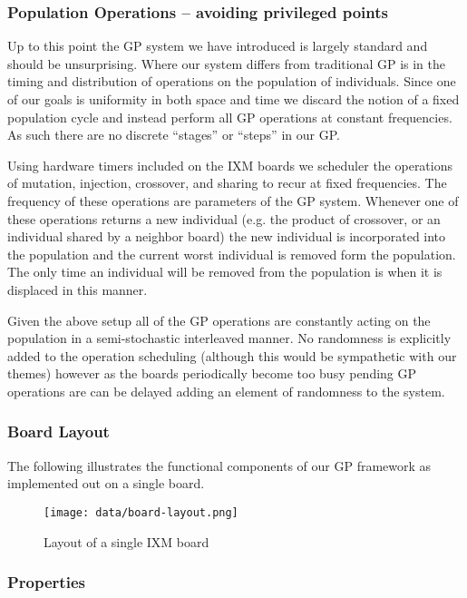 \documentclass[11pt]{article}
\begin{document}
\subsubsection*{Population Operations -- avoiding privileged points}
\label{sec-1.3.3}

Up to this point the GP system we have introduced is largely standard
and should be unsurprising.  Where our system differs from traditional
GP is in the timing and distribution of operations on the population
of individuals.  Since one of our goals is uniformity in both space
and time we discard the notion of a fixed population cycle and instead
perform all GP operations at constant frequencies.  As such there are
no discrete ``stages'' or ``steps'' in our GP.

Using hardware timers included on the IXM boards we scheduler the
operations of mutation, injection, crossover, and sharing to recur at
fixed frequencies.  The frequency of these operations are parameters
of the GP system.  Whenever one of these operations returns a new
individual (e.g. the product of crossover, or an individual shared by
a neighbor board) the new individual is incorporated into the
population and the current worst individual is removed form the
population.  The only time an individual will be removed from the
population is when it is displaced in this manner.

Given the above setup all of the GP operations are constantly acting
on the population in a semi-stochastic interleaved manner.  No
randomness is explicitly added to the operation scheduling (although
this would be sympathetic with our themes) however as the boards
periodically become too busy pending GP operations are can be delayed
adding an element of randomness to the system.

\subsubsection*{Board Layout}
\label{sec-1.3.4}

The following illustrates the functional components of our GP
framework as implemented out on a single board.

\begin{figure}[htb]
\centering
\texttt{[image: data/board-layout.png]}
\caption{Layout of a single IXM board}
\end{figure}



\subsubsection*{Properties}
\label{sec-1.3.5}
\end{document}
